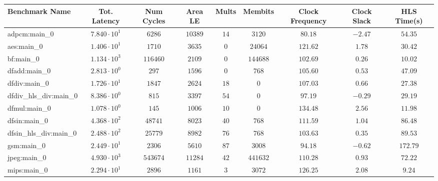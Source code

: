 \begin{tabular}{|l|c|c|c|c|c|c|c|c|}
\hline
Benchmark Name          & Tot. Latency           & Num Cycles & Area LE   & Mults   & Membits    & Clock Frequency & Clock Slack & HLS Time(s) \\
\hline
adpcm:main\_0           & $ 7.840 \cdot 10^{1} $ & $ 6286   $ & $ 10389 $ & $ 14  $ & $ 3120   $ & $ 80.18       $ & $ -2.47   $ & $ 54.35   $ \\
aes:main\_0             & $ 1.406 \cdot 10^{1} $ & $ 1710   $ & $ 3635  $ & $ 0   $ & $ 24064  $ & $ 121.62      $ & $ 1.78    $ & $ 30.42   $ \\
bf:main\_0              & $ 1.134 \cdot 10^{3} $ & $ 116460 $ & $ 2109  $ & $ 0   $ & $ 144688 $ & $ 102.69      $ & $ 0.26    $ & $ 10.02   $ \\
dfadd:main\_0           & $ 2.813 \cdot 10^{0} $ & $ 297    $ & $ 1596  $ & $ 0   $ & $ 768    $ & $ 105.60      $ & $ 0.53    $ & $ 47.09   $ \\
dfdiv:main\_0           & $ 1.726 \cdot 10^{1} $ & $ 1847   $ & $ 2624  $ & $ 18  $ & $ 0      $ & $ 107.03      $ & $ 0.66    $ & $ 27.38   $ \\
dfdiv\_hls\_div:main\_0 & $ 8.386 \cdot 10^{0} $ & $ 815    $ & $ 3397  $ & $ 54  $ & $ 0      $ & $ 97.19       $ & $ -0.29   $ & $ 29.19   $ \\
dfmul:main\_0           & $ 1.078 \cdot 10^{0} $ & $ 145    $ & $ 1006  $ & $ 10  $ & $ 0      $ & $ 134.48      $ & $ 2.56    $ & $ 11.98   $ \\
dfsin:main\_0           & $ 4.368 \cdot 10^{2} $ & $ 48741  $ & $ 8023  $ & $ 40  $ & $ 768    $ & $ 111.59      $ & $ 1.04    $ & $ 86.48   $ \\
dfsin\_hls\_div:main\_0 & $ 2.488 \cdot 10^{2} $ & $ 25779  $ & $ 8982  $ & $ 76  $ & $ 768    $ & $ 103.63      $ & $ 0.35    $ & $ 89.53   $ \\
gsm:main\_0             & $ 2.449 \cdot 10^{1} $ & $ 2306   $ & $ 5610  $ & $ 87  $ & $ 3008   $ & $ 94.18       $ & $ -0.62   $ & $ 172.79  $ \\
jpeg:main\_0            & $ 4.930 \cdot 10^{3} $ & $ 543674 $ & $ 11284 $ & $ 42  $ & $ 441632 $ & $ 110.28      $ & $ 0.93    $ & $ 72.22   $ \\
mips:main\_0            & $ 2.294 \cdot 10^{1} $ & $ 2896   $ & $ 1161  $ & $ 3   $ & $ 3072   $ & $ 126.25      $ & $ 2.08    $ & $ 9.24    $ \\

\end{tabular}
